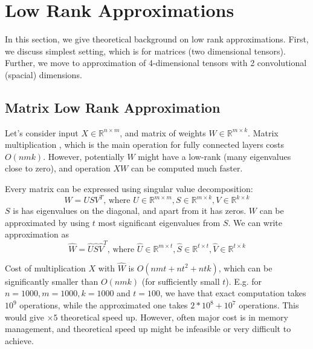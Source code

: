 \documentclass{article}
\begin{document}
 






\section{Low Rank Approximations}
In this section, we give theoretical background on low rank approximations. First, we discuss simplest setting, which is
for matrices (two dimensional tensors). Further, we move to approximation of 4-dimensional tensors with 2 convolutional (spacial)
dimensions.


\subsection{Matrix Low Rank Approximation}
Let's consider input $X \in \mathbb{R}^{n \times m}$, and matrix of weights $W \in \mathbb{R}^{m \times k}$. Matrix multiplication
, which is the main operation for fully connected layers costs $O(nmk)$. However, potentially $W$ might have a low-rank (many 
eigenvalues close to zero), and operation $XW$ can be computed much faster. 


Every matrix can be expressed using singular value decomposition:
\begin{equation*}
	W = USV^T\text{, where }U \in \mathbb{R}^{m \times m}, S \in \mathbb{R}^{m \times k}, V \in \mathbb{R}^{k \times k}
\end{equation*}
$S$ is has eigenvalues on the diagonal, and apart from it has zeros. $W$ can be approximated by using $t$ most significant
eigenvalues from $S$. We can write approximation as
\begin{equation*}
	\hat{W} = \hat{U}\hat{S}\hat{V}^T\text{, where }\hat{U} \in \mathbb{R}^{m \times t}, \hat{S} \in \mathbb{R}^{t \times t}, \hat{V} \in \mathbb{R}^{t \times k}
\end{equation*}

Cost of multiplication $X$ with $\hat{W}$ is $O(nmt + nt^2 + ntk)$, which can be significantly smaller than $O(nmk)$ (for sufficiently small $t$). E.g.
for $n = 1000, m = 1000, k = 1000$ and $t = 100$, we have that exact computation takes $10^9$ operations, while the approximated one takes
$2 * 10^8 + 10^7$ operations. This would give $\times 5$ theoretical speed up. However, often major cost is in memory management, 
and theoretical speed up might be infeasible or very difficult to achieve. 
\end{document}
